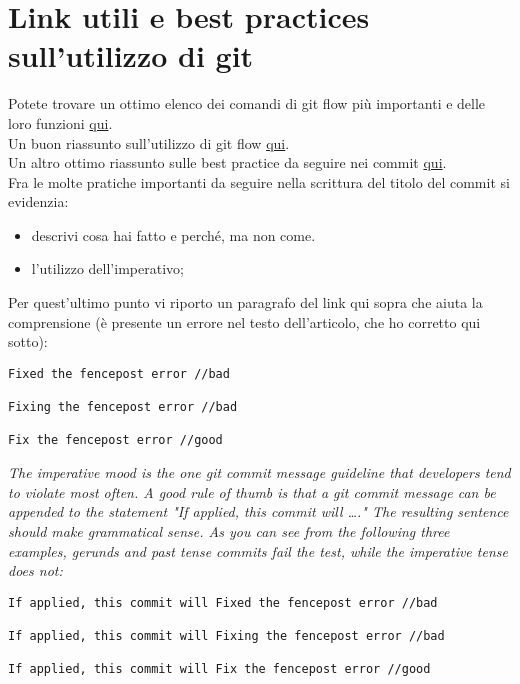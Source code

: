 \section{Link utili e best practices sull'utilizzo di git}
Potete trovare un ottimo elenco dei comandi di git flow pi\`{u} importanti e delle loro funzioni
\href{https://danielkummer.github.io/git-flow-cheatsheet/}{qui}. \\
Un buon riassunto sull'utilizzo di git flow \href{https://www.atlassian.com/git/tutorials/comparing-workflows/gitflow-workflow}{qui}.\\
Un altro ottimo riassunto sulle best practice da seguire nei commit \href{https://www.theserverside.com/video/Follow-these-git-commit-message-guidelines}{qui}. \\
Fra le molte pratiche importanti da seguire nella scrittura del titolo del commit si evidenzia:
\begin{itemize}
\item descrivi cosa hai fatto e perch\'{e}, ma non come.
\item l'utilizzo dell'imperativo;
\end{itemize}
Per quest'ultimo punto vi riporto un paragrafo del link qui sopra che aiuta la comprensione (\`{e} presente un errore nel testo dell'articolo, che ho corretto qui sotto):
\begin{lstlisting}
Fixed the fencepost error //bad

Fixing the fencepost error //bad

Fix the fencepost error //good
\end{lstlisting}
\textit{The imperative mood is the one git commit message guideline that developers tend to violate most often. A good rule of thumb is that a git commit message can be appended to the statement "If applied, this commit will …." The resulting sentence should make grammatical sense. As you can see from the following three examples, gerunds and past tense commits fail the test, while the imperative tense does not:}
\begin{lstlisting}
If applied, this commit will Fixed the fencepost error //bad

If applied, this commit will Fixing the fencepost error //bad

If applied, this commit will Fix the fencepost error //good
\end{lstlisting}
